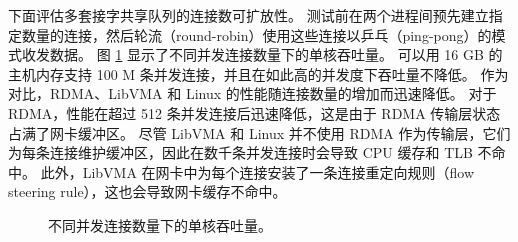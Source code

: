 %


下面评估多套接字共享队列的连接数可扩放性。
测试前在两个进程间预先建立指定数量的连接，然后轮流（round-robin）使用这些连接以乒乓（ping-pong）的模式收发数据。
图 \ref{socksdirect:fig:eval-connnum-tput} 显示了不同并发连接数量下的单核吞吐量。
\sys{} 可以用 16 GB 的主机内存支持 100 M 条并发连接，并且在如此高的并发度下吞吐量不降低。
作为对比，RDMA、LibVMA 和 Linux 的性能随连接数量的增加而迅速降低。
对于 RDMA，性能在超过 512 条并发连接后迅速降低，这是由于 RDMA 传输层状态占满了网卡缓冲区。
尽管 LibVMA 和 Linux 并不使用 RDMA 作为传输层，它们为每条连接维护缓冲区，因此在数千条并发连接时会导致 CPU 缓存和 TLB 不命中。
此外，LibVMA 在网卡中为每个连接安装了一条连接重定向规则（flow steering rule），这也会导致网卡缓存不命中。

\begin{figure}[htbp]
	\centering
	
	\caption{不同并发连接数量下的单核吞吐量。}
	\label{socksdirect:fig:eval-connnum-tput}
\end{figure}


